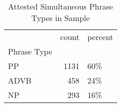 \begin{table}[htbp!]
\centering
\caption{Attested Simultaneous Phrase Types in Sample}
\label{table:sim_phtype_ct}
\begin{tabular}{lrl}
\toprule
{} &  count & percent \\
Phrase Type &        &         \\
\midrule
PP          &   1131 &     60\% \\
ADVB        &    458 &     24\% \\
NP          &    293 &     16\% \\
\bottomrule
\end{tabular}
\end{table}
